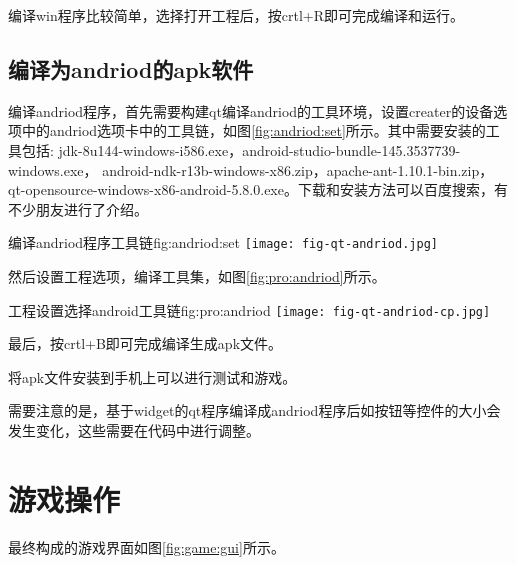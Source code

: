 \documentclass[11pt,twoside]{article} %
\begin{document}
编译win程序比较简单，选择打开工程后，按crtl+R即可完成编译和运行。

\subsection{编译为andriod的apk软件}

编译andriod程序，首先需要构建qt编译andriod的工具环境，设置creater的设备选项中的andriod选项卡中的工具链，如图\ref{fig:andriod:set}所示。其中需要安装的工具包括:
jdk-8u144-windows-i586.exe，android-studio-bundle-145.3537739-windows.exe，
android-ndk-r13b-windows-x86.zip，apache-ant-1.10.1-bin.zip，
qt-opensource-windows-x86-android-5.8.0.exe。下载和安装方法可以百度搜索，有不少朋友进行了介绍。

\begin{insertfigure}{编译andriod程序工具链}{fig:andriod:set}{}%
  \centering
  \texttt{[image: fig-qt-andriod.jpg]}
\end{insertfigure}

然后设置工程选项，编译工具集，如图\ref{fig:pro:andriod}所示。

\begin{insertfigure}{工程设置选择android工具链}{fig:pro:andriod}{}%
  \centering
  \texttt{[image: fig-qt-andriod-cp.jpg]}
\end{insertfigure}

最后，按crtl+B即可完成编译生成apk文件。

将apk文件安装到手机上可以进行测试和游戏。

需要注意的是，基于widget的qt程序编译成andriod程序后如按钮等控件的大小会发生变化，这些需要在代码中进行调整。

\section{游戏操作}
最终构成的游戏界面如图\ref{fig:game:gui}所示。
\end{document}
